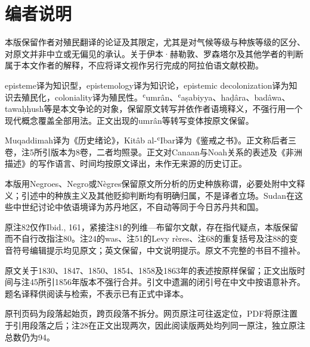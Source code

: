 \documentclass[10pt,a4paper]{article}
\begin{document}
\section*{编者说明}{\small
本版保留作者对殖民翻译的论证及其限定，尤其是对气候等级与种族等级的区分、对原文并非中立或无偏见的承认。关于伊本·赫勒敦、罗森塔尔及其他学者的判断属于本文作者的解释，不应将译文视作另行完成的阿拉伯语文献校勘。\par
episteme译为知识型，epistemology译为知识论，epistemic decolonization译为知识去殖民化，coloniality译为殖民性。ʿumrân、ʿaṣabiyya、haḍâra、badâwa、tawaḥḥush等是本文争论的对象，保留原文转写并依作者语境释义，不强行用一个现代概念覆盖全部用法。正文出现的umrân等转写变体按原文保留。\par
Muqaddimah译为《历史绪论》，Kitâb al-ʿIbar译为《鉴戒之书》。正文称后者三卷，注5所引版本为8卷，二者均照录。正文对Canaan与Noah关系的表述及《非洲描述》的写作语言、时间均按原文译出，未作无来源的历史订正。\par
本版用Negroes、Negro或Nègres保留原文所分析的历史种族称谓，必要处附中文释义；引述中的种族主义及其他贬抑判断均有明确归属，不是译者立场。Sudan在这些中世纪讨论中依语境译为苏丹地区，不自动等同于今日苏丹共和国。\par
原注82仅作Ibid., 161，紧接注81的列维—布留尔文献，存在指代疑点，本版保留而不自行改指注80。注24的was、注51的Levy rères、注68的重复括号及注88的变音符号编辑提示均见原文；英文保留，中文说明提示。原文不完整的书目不擅补。\par
原文关于1830、1847、1850、1854、1858及1863年的表述按原样保留；正文出版时间与注45所引1856年版本不强行合并。引文中遗漏的闭引号在中文中按语意补齐。题名译释供阅读与检索，不表示已有正式中译本。\par
原刊页码为段落起始页，跨页段落不拆分。网页原注可往返定位，PDF将原注置于引用段落之后；注28在正文出现两次，因此阅读版两处均列同一原注，独立原注总数仍为94。\par
}
\end{document}
